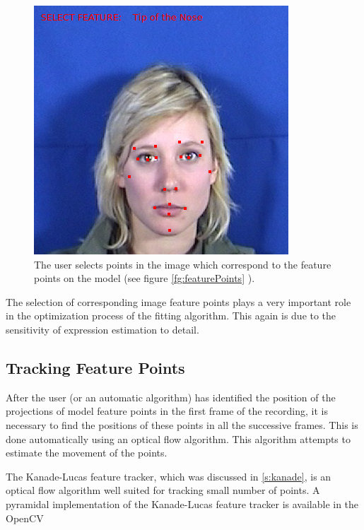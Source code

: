 \documentclass[11pt,a4paper]{report}
\begin{document}
\begin{figure}[H]
\begin{centering}
\includegraphics[scale=0.60]{images/featureSelection.png}
\par\end{centering}

\caption{The user selects points in the image which correspond to the feature
  points on the model (see figure \ref{fg:featurePoints} ).}
\label{fg:featurePoints2}

\end{figure}

The selection of corresponding image feature points plays a very important role
in the optimization process of the fitting algorithm. This again is due to the
sensitivity of expression estimation to detail.

\subsection{Tracking Feature Points}
After the user (or an automatic algorithm) has identified the position of the projections of model
feature points in the first frame of the recording, it is necessary to find
the positions of these points in all the successive frames. This is done
automatically using an optical flow algorithm. This algorithm attempts to
estimate the movement of the points.

The Kanade-Lucas feature tracker, which was discussed in \ref{s:kanade}, is an
optical flow algorithm well suited for tracking small number of points. A
pyramidal implementation of the Kanade-Lucas feature tracker is available in the OpenCV
\end{document}
